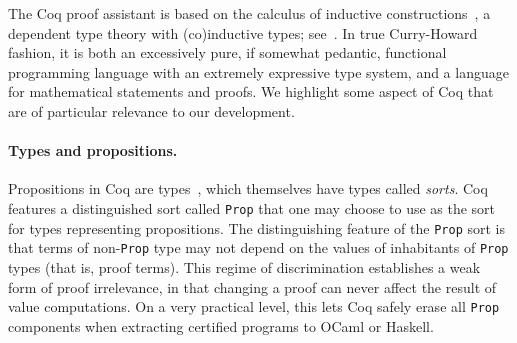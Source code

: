 \documentclass[a4paper,10pt,runningheads]{llncs}
\begin{document}

The Coq proof assistant is based on the calculus of inductive
constructions~\cite{CoquandHuet,CoquandPaulin}, a dependent type theory with (co)inductive types; see~\cite{Coq,BC04}. In true Curry-Howard fashion, it is both an excessively pure, if somewhat pedantic, functional programming language with an extremely expressive type system, and a language for mathematical statements and proofs. We highlight some aspect of Coq that are of particular relevance to our development.

\paragraph{Types and propositions.}

Propositions in Coq are types~\cite{ITT,CMCP}, which themselves have types called \emph{sorts}. Coq features a distinguished sort called \lstinline|Prop| that one may choose to use as the sort for types representing propositions. The distinguishing feature of the \lstinline|Prop| sort is that terms of non-\lstinline|Prop| type may not depend on the values of inhabitants of \lstinline|Prop| types (that is, proof terms).
This regime of discrimination establishes a weak form of proof irrelevance, in that changing a proof can never affect the result of value computations. On a very practical level, this lets Coq safely erase all \lstinline|Prop| components when extracting certified programs to OCaml or Haskell.


\end{document}
